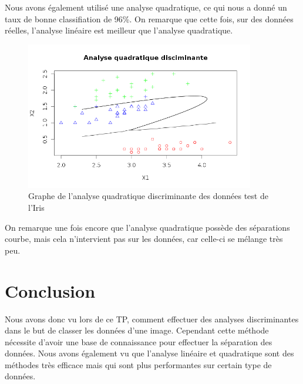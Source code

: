 \documentclass[a4paper,11pt]{article}
\begin{document}
  Nous avons également utilisé une analyse quadratique, ce qui nous a donné un taux de bonne 
  classifiation de 96\%. On remarque que cette fois, sur des données réelles, l'analyse linéaire
  est meilleur que l'analyse quadratique.
  
  \begin{figure}[h]
   \center
   \includegraphics[width=10cm]{iris_quadratique.png}
   \caption{Graphe de l'analyse quadratique discriminante des données test de l'Iris}
  \end{figure}
  
  On remarque une fois encore que l'analyse quadratique possède des séparations courbe,
  mais cela n'intervient pas sur les données, car celle-ci se mélange très peu.
  
  
  \section*{Conclusion}
  Nous avons donc vu lors de ce TP, comment effectuer des analyses discriminantes dans le but
  de classer les données d'une image. Cependant cette méthode nécessite d'avoir une base de connaissance %
  pour effectuer la séparation des données. Nous avons également vu que l'analyse linéaire et quadratique
  sont des méthodes très efficace mais qui sont plus performantes sur certain type de données. 
\end{document}
